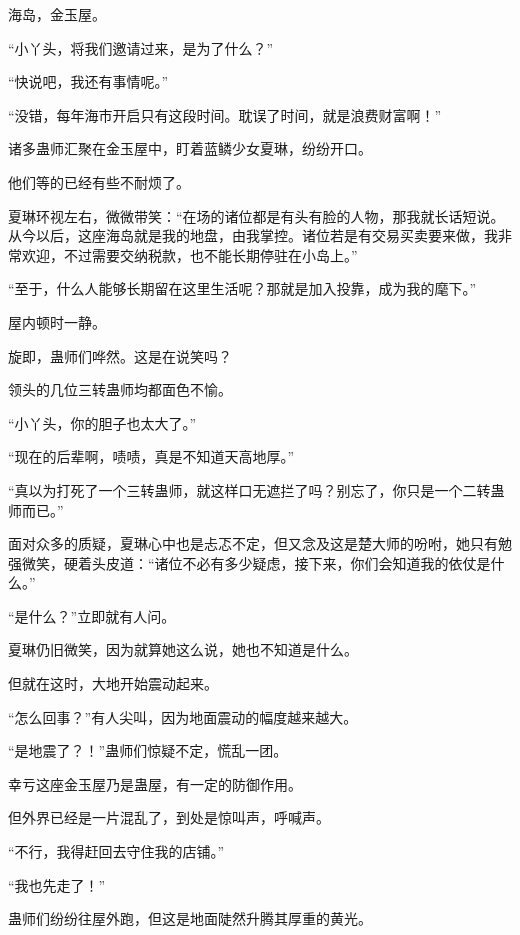 
\begin{this_body}



海岛，金玉屋。

“小丫头，将我们邀请过来，是为了什么？”

“快说吧，我还有事情呢。”

“没错，每年海市开启只有这段时间。耽误了时间，就是浪费财富啊！”

诸多蛊师汇聚在金玉屋中，盯着蓝鳞少女夏琳，纷纷开口。

他们等的已经有些不耐烦了。

夏琳环视左右，微微带笑：“在场的诸位都是有头有脸的人物，那我就长话短说。从今以后，这座海岛就是我的地盘，由我掌控。诸位若是有交易买卖要来做，我非常欢迎，不过需要交纳税款，也不能长期停驻在小岛上。”

“至于，什么人能够长期留在这里生活呢？那就是加入投靠，成为我的麾下。”

屋内顿时一静。

旋即，蛊师们哗然。这是在说笑吗？

领头的几位三转蛊师均都面色不愉。

“小丫头，你的胆子也太大了。”

“现在的后辈啊，啧啧，真是不知道天高地厚。”

“真以为打死了一个三转蛊师，就这样口无遮拦了吗？别忘了，你只是一个二转蛊师而已。”

面对众多的质疑，夏琳心中也是忐忑不定，但又念及这是楚大师的吩咐，她只有勉强微笑，硬着头皮道：“诸位不必有多少疑虑，接下来，你们会知道我的依仗是什么。”

“是什么？”立即就有人问。

夏琳仍旧微笑，因为就算她这么说，她也不知道是什么。

但就在这时，大地开始震动起来。

“怎么回事？”有人尖叫，因为地面震动的幅度越来越大。

“是地震了？！”蛊师们惊疑不定，慌乱一团。

幸亏这座金玉屋乃是蛊屋，有一定的防御作用。

但外界已经是一片混乱了，到处是惊叫声，呼喊声。

“不行，我得赶回去守住我的店铺。”

“我也先走了！”

蛊师们纷纷往屋外跑，但这是地面陡然升腾其厚重的黄光。


\end{this_body}

